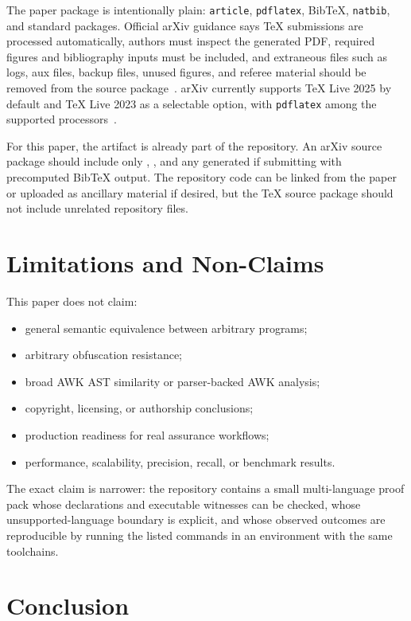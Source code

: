 \documentclass[11pt,letterpaper]{article}
\begin{document}
The paper package is intentionally plain: \texttt{article},
\texttt{pdflatex}, BibTeX, \texttt{natbib}, and standard packages.
Official arXiv guidance says TeX submissions are processed
automatically, authors must inspect the generated PDF, required figures
and bibliography inputs must be included, and extraneous files such as
logs, aux files, backup files, unused figures, and referee material
should be removed from the source package~\cite{arxivSubmitTex2026}.
arXiv currently supports TeX Live 2025 by default and TeX Live 2023 as
a selectable option, with \texttt{pdflatex} among the supported
processors~\cite{arxivTexLive2026}.

For this paper, the artifact is already part of the repository. An
arXiv source package should include only ,
, and any generated  if submitting
with precomputed BibTeX output. The repository code can be linked from
the paper or uploaded as ancillary material if desired, but the TeX
source package should not include unrelated repository files.

\section{Limitations and Non-Claims}

This paper does not claim:

\begin{itemize}
  \item general semantic equivalence between arbitrary programs;
  \item arbitrary obfuscation resistance;
  \item broad AWK AST similarity or parser-backed AWK analysis;
  \item copyright, licensing, or authorship conclusions;
  \item production readiness for real assurance workflows;
  \item performance, scalability, precision, recall, or benchmark
        results.
\end{itemize}

The exact claim is narrower: the repository contains a small
multi-language proof pack whose declarations and executable witnesses
can be checked, whose unsupported-language boundary is explicit, and
whose observed outcomes are reproducible by running the listed commands
in an environment with the same toolchains.

\section{Conclusion}
\end{document}

